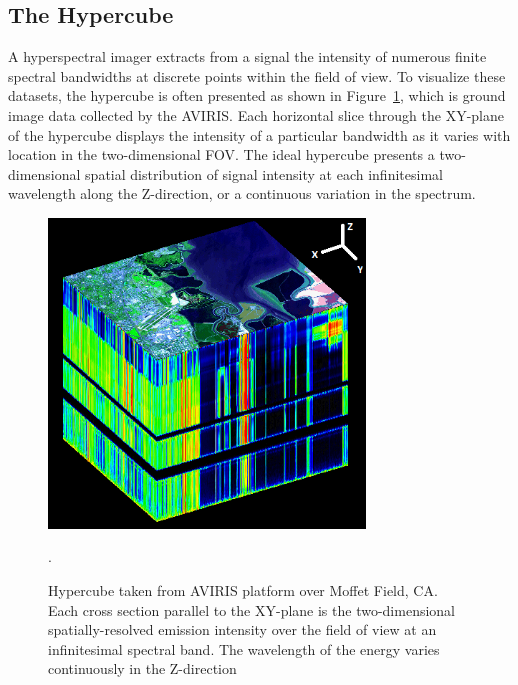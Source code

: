 \subsection{The Hypercube}
A hyperspectral imager extracts from a signal the intensity of numerous finite spectral bandwidths at discrete points within the field of view. To visualize these datasets, the hypercube is often presented as shown in Figure~\ref{fig:hypercube}, which is ground image data collected by the \ac{AVIRIS}. Each horizontal slice through the XY-plane of the hypercube displays the intensity of a particular bandwidth as it varies with location in the two-dimensional \ac{FOV}. The ideal hypercube presents a two-dimensional spatial distribution of signal intensity at each infinitesimal wavelength along the Z-direction, or a continuous variation in the spectrum.

\begin{figure}[htb]		%
\centering
\includegraphics[width=0.75\textwidth]{images/chap1/avcubebig}
\caption{Hypercube taken from AVIRIS platform over Moffet Field, CA. Each cross section parallel to the XY-plane is the two-dimensional spatially-resolved emission intensity over the field of view at an infinitesimal spectral band. The wavelength of the energy varies continuously in the Z-direction~\cite{AVIRIS}}.
\label{fig:hypercube}
\end{figure}

